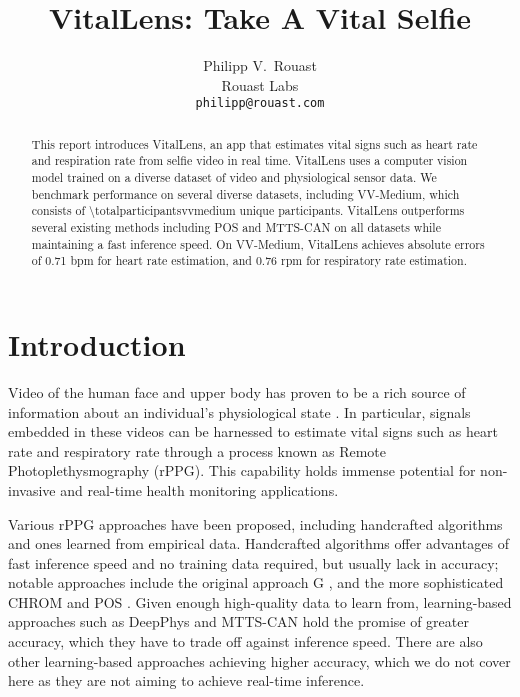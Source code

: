 \documentclass{article}
\title{VitalLens: Take A Vital Selfie}
\author{%
  Philipp V.~Rouast \\
  Rouast Labs\\
  \texttt{philipp@rouast.com} \\
}
\begin{document}
\maketitle


\begin{abstract}
This report introduces VitalLens, an app that estimates vital signs such as heart rate and respiration rate from selfie video in real time.
VitalLens uses a computer vision model trained on a diverse dataset of video and physiological sensor data.
We benchmark performance on several diverse datasets, including VV-Medium, which consists of \num{\totalparticipantsvvmedium} unique participants.
VitalLens outperforms several existing methods including POS and MTTS-CAN on all datasets while maintaining a fast inference speed.
On VV-Medium, VitalLens achieves absolute errors of 0.71 bpm for heart rate estimation, and 0.76 rpm for respiratory rate estimation.
\end{abstract}


\section{Introduction}
\label{sec:introduction}

Video of the human face and upper body has proven to be a rich source of information about an individual's physiological state \cite{verkruysse2008remote}.
In particular, signals embedded in these videos can be harnessed to estimate vital signs such as heart rate and respiratory rate through a process known as Remote Photoplethysmography (rPPG).
This capability holds immense potential for non-invasive and real-time health monitoring applications.

Various rPPG approaches have been proposed, including handcrafted algorithms and ones learned from empirical data.
Handcrafted algorithms offer advantages of fast inference speed and no training data required, but usually lack in accuracy; notable approaches include the original approach G \cite{verkruysse2008remote}, and the more sophisticated CHROM \cite{de2013robust} and POS \cite{wang2017algorithmic}.
Given enough high-quality data to learn from, learning-based approaches such as DeepPhys \cite{chen2018deep} and MTTS-CAN \cite{liu2020multi} hold the promise of greater accuracy, which they have to trade off against inference speed.
There are also other learning-based approaches achieving higher accuracy, which we do not cover here as they are not aiming to achieve real-time inference.
\end{document}
